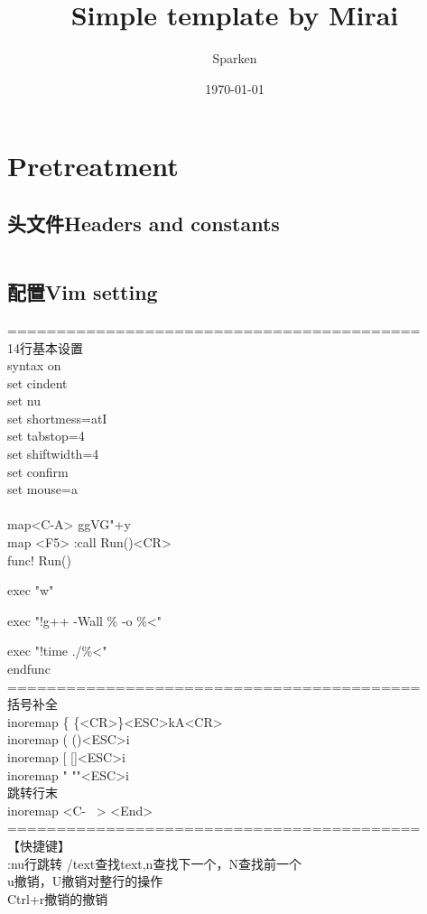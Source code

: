 \documentclass[twoside,sub3section,UTF8]{ctexart}						%
\title{Simple template by Mirai}						%
\author{Sparken}										%
\date{\today}											%
\begin{document}
\maketitle

\newpage
\tableofcontents 														%

\newpage 																%
\section{Pretreatment}												%
	\subsection{头文件Headers and constants}
	\inputminted[breaklines]{c++}{"Other/headers.cpp"}
	\newpage
	\subsection{配置Vim setting}
		\noindent==========================================\\
		14行基本设置\\
		syntax on\\
		set cindent\\
		set nu		\\
		set shortmess=atI	\\
		set tabstop=4\\
		set shiftwidth=4\\
		set confirm\\
		set mouse=a\\
\\
		map<C-A> ggVG"+y\\
		map <F5> :call Run()<CR>\\
		func! Run()\par
			exec "w"\par
			exec "!g++ -Wall \% -o \%<"\par
			exec "!time ./\%<"\\
		endfunc\\
		==========================================\\
		括号补全\\
		inoremap \{ \{<CR>\}<ESC>kA<CR>\\
		inoremap ( ()<ESC>i\\
		inoremap [ []<ESC>i\\
		inoremap " ""<ESC>i\\
		跳转行末\\
		inoremap <C- \ > <End>\\
		==========================================\\
		【快捷键】\\
		:nu行跳转
		/text查找text,n查找下一个，N查找前一个\\
		u撤销，U撤销对整行的操作\\
		Ctrl+r撤销的撤销\\
\end{document}
